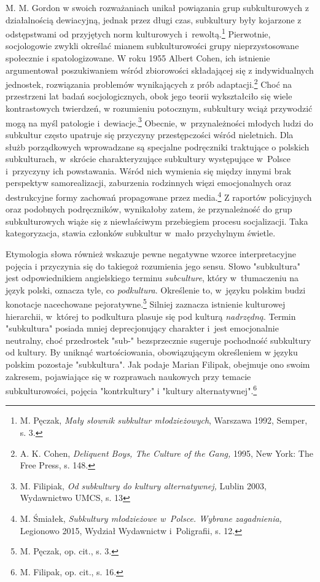\documentclass[12pt, a4paper, titlepage]{report}
\begin{document}
M. M. Gordon w swoich rozważaniach unikał powiązania grup subkulturowych z działalnością dewiacyjną, jednak przez długi czas, subkultury były kojarzone z odstępstwami od przyjętych norm kulturowych i~rewoltą.\footnote{M. Pęczak, \textit{Mały słownik subkultur młodzieżowych}, Warszawa 1992, Semper, s. 3.} Pierwotnie, socjologowie zwykli określać mianem subkulturowości grupy nieprzystosowane społecznie i spatologizowane. W roku 1955 Albert Cohen, ich istnienie argumentował poszukiwaniem wśród zbiorowości składającej się z indywidualnych jednostek, rozwiązania problemów wynikających z prób adaptacji.\footnote{A. K. Cohen, \textit{Deliquent Boys, The Culture of the Gang,} 1995, New York: The Free Press, s. 148.} Choć na przestrzeni lat badań socjologicznych, obok jego teorii wykształciło się wiele kontrastowych twierdzeń, w rozumieniu potocznym, subkultury wciąż przywodzić mogą na myśl patologie i~dewiacje.\footnote{M. Filipiak, \textit{Od subkultury do kultury alternatywnej,} Lublin 2003, Wydawnictwo UMCS, s. 13} Obecnie, w~przynależności młodych ludzi do subkultur często upatruje się przyczyny przestępczości wśród nieletnich. Dla służb porządkowych wprowadzane są specjalne podręczniki traktujące o polskich subkulturach, w~skrócie charakteryzujące subkultury występujące w~Polsce i~przyczyny ich powstawania. Wśród nich wymienia się między innymi brak perspektyw samorealizacji, zaburzenia rodzinnych więzi emocjonalnych oraz destrukcyjne formy zachowań propagowane przez media.\footnote{M. Śmiałek, \textit{Subkultury młodzieżowe w~Polsce. Wybrane zagadnienia,} Legionowo 2015, Wydział Wydawnictw i~Poligrafii, s. 12.} Z raportów policyjnych oraz podobnych podręczników, wynikałoby zatem, że przynależność do grup subkulturowych wiąże się z niewłaściwym przebiegiem procesu socjalizacji. Taka kategoryzacja, stawia członków subkultur w~mało przychylnym świetle. 

Etymologia słowa również wskazuje pewne negatywne wzorce interpretacyjne pojęcia i przyczynia się do takiegoż rozumienia jego sensu. Słowo "subkultura" jest odpowiednikiem angielskiego terminu \textit{subculture}, który w~tłumaczeniu na język polski, oznacza tyle, co \textit{podkultura}. Określenie to, w~języku polskim budzi konotacje nacechowane pejoratywne.\footnote{M. Pęczak, op. cit., s. 3.} Silniej zaznacza istnienie kulturowej hierarchii, w~której to podkultura plasuje się pod kulturą \textit{nadrzędną}. Termin "subkultura" posiada mniej deprecjonujący charakter i~jest emocjonalnie neutralny, choć przedrostek "sub-" bezsprzecznie sugeruje pochodność subkultury od kultury. By uniknąć wartościowania, obowiązującym określeniem w języku polskim pozostaje "subkultura". Jak podaje Marian Filipak, obejmuje ono swoim zakresem, pojawiające się w rozprawach naukowych przy temacie subkulturowości, pojęcia "kontrkultury" i "kultury alternatywnej".\footnote{M. Filipak, op. cit., s. 16.}
\end{document}
